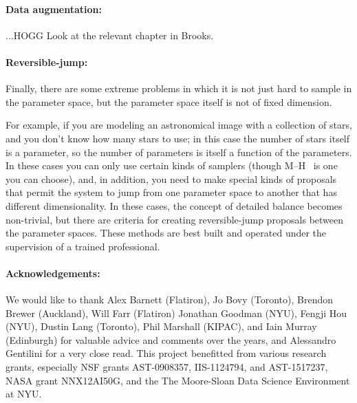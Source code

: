 \documentclass[modern]{aastex61}
\newcommand{\MCMC}{\acronym{MCMC}}
\begin{document}
\paragraph{Data augmentation:}
...HOGG Look at the relevant chapter in Brooks.

\paragraph{Reversible-jump:}
Finally, there are some extreme problems in which it is not just hard
to sample in the parameter space, but the parameter space itself is
not of fixed dimension.

For example, if you are modeling an astronomical image with a
collection of stars, and you don't know how many stars to use; in this
case the number of stars itself is a parameter, so the number of
parameters is itself a function of the parameters.
In these cases you can only use certain kinds of samplers (though M--H
\MCMC\ is one you can choose), and, in addition, you need to make
special kinds of proposals that permit the system to jump from one
parameter space to another that has different dimensionality.
In these cases, the concept of detailed balance becomes non-trivial,
but there are criteria for creating reversible-jump proposals between
the parameter spaces.
These methods are best built and operated under the supervision of a
trained professional.

\clearpage
\paragraph{Acknowledgements:}
We would like to thank
          Alex Barnett (Flatiron),
          Jo Bovy (Toronto),
          Brendon Brewer (Auckland),
          Will Farr (Flatiron)
          Jonathan Goodman (NYU),
          Fengji Hou (NYU),
          Dustin Lang (Toronto),
          Phil Marshall (KIPAC), and
          Iain Murray (Edinburgh)
        for valuable advice and comments over the years, and
          Alessandro Gentilini
        for a very close read.
        This project benefitted from various research grants, especially
          NSF grants AST-0908357, IIS-1124794, and AST-1517237,
          NASA grant NNX12AI50G,
          and the The Moore-Sloan Data Science Environment at NYU.
\end{document}
